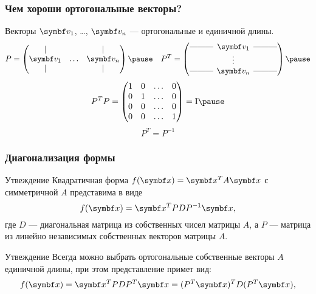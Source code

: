 \begin{frame}
    \frametitle{Чем хороши ортогональные векторы?}

    Векторы $\bv_1$, \ldots, $\bv_n$ — ортогональные и единичной длины.
    \[
    P = \begin{pmatrix}
        \vert &  & \vert \\
        \bv_1 & \ldots & \bv_n \\
        \vert &  & \vert \\
    \end{pmatrix}    \pause \quad
    P^T = \begin{pmatrix}
\text{———} \hspace{-0.2cm} & \bv_1 & \hspace{-0.2cm} \text{———} \\
 & \vdots &  \\
\text{———} \hspace{-0.2cm} & \bv_n & \hspace{-0.2cm} \text{———} \\
        \end{pmatrix}    \pause
    \]
%
    \[
    P^T P = \begin{pmatrix}        
        1 & 0 & \ldots & 0 \\
        0 & 1 & \ldots & 0 \\
        0 & 0 & \ldots & 0 \\
        0 & 0 & \ldots & 1 \\
    \end{pmatrix}  = \Id   \pause
    \]
%
    \[
    P^T = P^{-1}    
    \]
    
\end{frame}

\begin{frame}
    \frametitle{Диагонализация формы}

    \begin{block}{Утвеждение}
        Квадратичная форма $f(\bx) = \bx^T A \bx$ с симметричной $A$ представима в виде
        \[
        f(\bx) = \bx^T PDP^{-1} \bx,    
        \] 
        где $D$ — диагональная матрица из собственных чисел матрицы $A$, 
        а $P$ — матрица из линейно независимых собственных векторов матрицы $A$.
    \end{block}
    \pause
\begin{block}{Утвеждение}
    Всегда можно выбрать ортогональные собственные векторы $A$ единичной длины, 
    при этом представление примет вид:
    \[
    f(\bx) = \bx^T PDP^T \bx = (P^T \bx)^T D (P^T \bx),    
    \] 
\end{block}
    
\end{frame}


